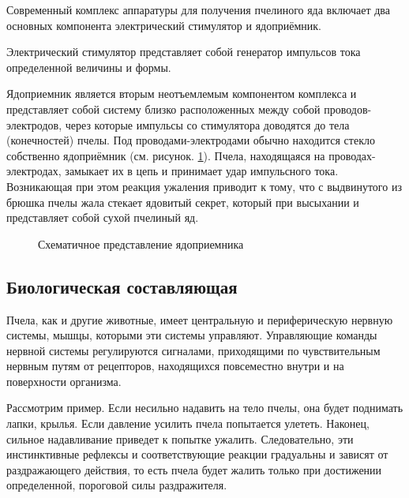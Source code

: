 Современный комплекс аппаратуры для получения пчелиного яда включает два основных компонента \longndash электрический стимулятор и ядоприёмник.

Электрический стимулятор представляет собой генератор импульсов тока определенной величины и формы.

Ядоприемник является вторым неотъемлемым компонентом комплекса и представляет собой систему близко расположенных между собой проводов-электродов, через которые импульсы со стимулятора доводятся до тела (конечностей) пчелы. Под проводами-электродами обычно находится стекло \longndash собственно ядоприёмник (см. рисунок. \ref{img:poison_reciever}). Пчела, находящаяся на проводах-электродах, замыкает их в цепь и принимает удар импульсного тока. Возникающая при этом реакция ужаления приводит к тому, что с выдвинутого из брюшка пчелы жала стекает ядовитый секрет, который при высыхании и представляет собой сухой пчелиный яд.

\begin{figure}[h]
  
  \caption{Схематичное представление ядоприемника}
  \label{img:poison_reciever}
\end{figure}

\subsection*{Биологическая составляющая}

Пчела, как и другие животные, имеет центральную и периферическую нервную системы, мышцы, которыми эти системы управляют. Управляющие команды нервной системы регулируются сигналами, приходящими по чувствительным нервным путям от рецепторов, находящихся повсеместно \longndash внутри и на поверхности организма.

Рассмотрим пример. Если несильно надавить на тело пчелы, она будет поднимать лапки, крылья. Если давление усилить \longndash пчела попытается улететь. Наконец, сильное надавливание приведет к попытке ужалить. Следовательно, эти инстинктивные рефлексы и соответствующие реакции градуальны и зависят от раздражающего действия, то есть пчела будет жалить только при достижении определенной, пороговой силы раздражителя.

